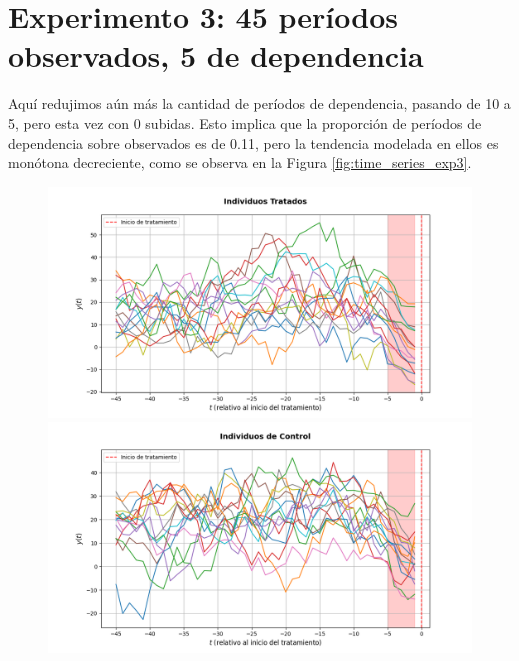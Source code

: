 \documentclass[../../main.tex]{subfiles}
\begin{document}
\section{Experimento 3: 45 períodos observados, 5 de dependencia}
Aquí redujimos aún más la cantidad de períodos de dependencia, pasando de 10 a 5,
pero esta vez con 0 subidas. Esto implica que la proporción de períodos de dependencia
sobre observados es de 0.11, pero la tendencia modelada en ellos es monótona decreciente,
como se observa en la Figura \ref{fig:time_series_exp3}.

\begin{figure}[H]
    \centering
    \begin{minipage}{0.48\textwidth}
        \centering
        \includegraphics[scale=0.3]{figs/Exp3/plot_time_series_Tratados.png}
    \end{minipage}
    \hfill
    \begin{minipage}{0.48\textwidth}
        \centering
        \includegraphics[scale=0.3]{figs/Exp3/plot_time_series_de_Control.png}
    \end{minipage}
    \vspace{0.5em}
    \begin{minipage}{0.6\textwidth}

\end{minipage}
\end{figure}
\end{document}
